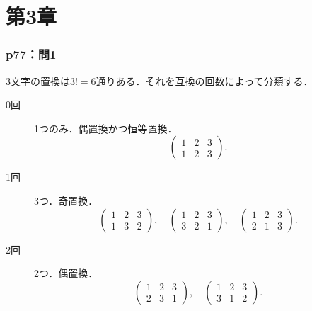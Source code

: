 
\part*{第3章}


\section*{p77：問1}


\begin{tanswer}
  3文字の置換は$3!=6$通りある．それを互換の回数によって分類する．
  \begin{description}
    \item[0回] 1つのみ．偶置換かつ恒等置換．
          \[
            \begin{pmatrix} 1 & 2 & 3 \\ 1 & 2 & 3 \end{pmatrix}.
          \]
    \item [1回] 3つ．奇置換．
          \[
            \begin{pmatrix} 1 & 2 & 3\\ 1 & 3 & 2 \end{pmatrix},\quad
            \begin{pmatrix} 1 & 2 & 3\\ 3 & 2 & 1 \end{pmatrix},\quad
            \begin{pmatrix} 1 & 2 & 3\\ 2 & 1 & 3 \end{pmatrix}.
          \]
    \item [2回] 2つ．偶置換．
          \[
            \begin{pmatrix} 1 & 2 & 3\\ 2 & 3 & 1 \end{pmatrix},\quad
            \begin{pmatrix} 1 & 2 & 3\\ 3 & 1 & 2 \end{pmatrix}.
          \]
  \end{description}
\end{tanswer}


